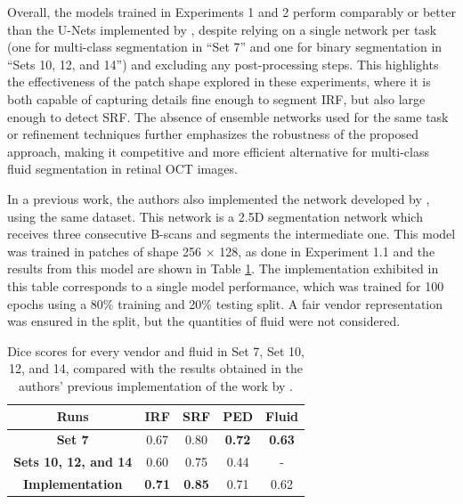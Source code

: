 Overall, the models trained in Experiments 1 and 2 perform comparably or better than the U-Nets implemented by \textcite{Alsaih2020}, despite relying on a single network per task (one for multi-class segmentation in ``Set 7'' and one for binary segmentation in ``Sets 10, 12, and 14'') and excluding any post-processing steps. This highlights the effectiveness of the patch shape explored in these experiments, where it is both capable of capturing details fine enough to segment IRF, but also large enough to detect SRF. The absence of ensemble networks used for the same task or refinement techniques further emphasizes the robustness of the proposed approach, making it competitive and more efficient alternative for multi-class fluid segmentation in retinal OCT images.
\par
In a previous work, the authors also implemented the network developed by \textcite{Tennakoon2018}, using the same dataset. This network is a 2.5D segmentation network which receives three consecutive B-scans and segments the intermediate one. This model was trained in patches of shape 256 $\times$ 128, as done in Experiment 1.1 and the results from this model are shown in Table \ref{tab:Experiment1VsExperiment2VsTennakoon}. The implementation exhibited in this table corresponds to a single model performance, which was trained for 100 epochs using a 80\% training and 20\% testing split. A fair vendor representation was ensured in the split, but the quantities of fluid were not considered.

\begin{table}[!ht]
	\caption{Dice scores for every vendor and fluid in Set 7, Set 10, 12, and 14, compared with the results obtained in the authors' previous implementation of the work by \textcite{Tennakoon2018}.}
	\centering
	\begin{tabular}{|c|c|c|c|c|}
		\hline
		\textbf{Runs} & \textbf{IRF} & 
		\textbf{SRF} & 
		\textbf{PED} &
		\textbf{Fluid} \\
		
		\hline
		
		\textbf{Set 7} & 0.67 & 0.80 & \textbf{0.72} & \textbf{0.63} \\
		
		\hline
		
		\textbf{Sets 10, 12, and 14} & 0.60 & 0.75 & 0.44 & - \\
		
		\hline
		\hline
		
		\textbf{\textcite{Tennakoon2018} Implementation} & \textbf{0.71} & \textbf{0.85} & 0.71 & 0.62 \\
		
		\hline
		
	\end{tabular}
	\label{tab:Experiment1VsExperiment2VsTennakoon}
\end{table}

